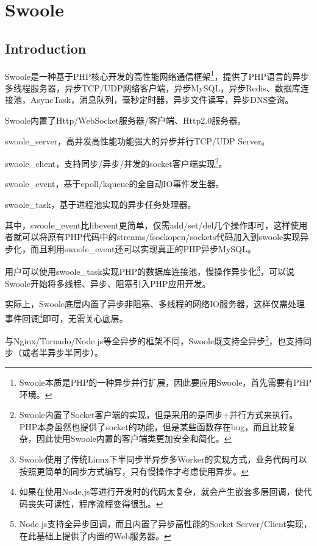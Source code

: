 \part{Swoole}



\chapter{Introduction}


Swoole是一种基于PHP核心开发的高性能网络通信框架\footnote{Swoole本质是PHP的一种异步并行扩展，因此要应用Swoole，首先需要有PHP环境。}，提供了PHP语言的异步多线程服务器，异步TCP/UDP网络客户端，异步MySQL，异步Redis、数据库连接池，AsyncTask，消息队列，毫秒定时器，异步文件读写，异步DNS查询。

Swoole内置了Http/WebSocket服务器/客户端、Http2.0服务器。

\begin{compactitem}
\item swoole\_server，高并发高性能功能强大的异步并行TCP/UDP Server。
\item swoole\_client，支持同步/异步/并发的socket客户端实现\footnote{Swoole内置了Socket客户端的实现，但是采用的是同步+并行方式来执行。PHP本身虽然也提供了socket的功能，但是某些函数存在bug，而且比较复杂，因此使用Swoole内置的客户端类更加安全和简化。}。
\item swoole\_event，基于epoll/kqueue的全自动IO事件发生器。
\item swoole\_task，基于进程池实现的异步任务处理器。
\end{compactitem}

其中，swoole\_event比libevent更简单，仅需add/set/del几个操作即可，这样使用者就可以将原有PHP代码中的streams/fsockopen/sockets代码加入到swoole实现异步化，而且利用swoole\_event还可以实现真正的PHP异步MySQL。

用户可以使用swoole\_task实现PHP的数据库连接池，慢操作异步化\footnote{Swoole使用了传统Linux下半同步半异步多Worker的实现方式，业务代码可以按照更简单的同步方式编写，只有慢操作才考虑使用异步。}，可以说Swoole开始将多线程、异步、阻塞引入PHP应用开发。

实际上，Swoole底层内置了异步非阻塞、多线程的网络IO服务器，这样仅需处理事件回调\footnote{如果在使用Node.js等进行开发时的代码太复杂，就会产生嵌套多层回调，使代码丧失可读性，程序流程变得很乱。}即可，无需关心底层。

与Nginx/Tornado/Node.js等全异步的框架不同，Swoole既支持全异步\footnote{Node.js支持全异步回调，而且内置了异步高性能的Socket Server/Client实现，在此基础上提供了内置的Web服务器。}，也支持同步（或者半异步半同步）。

